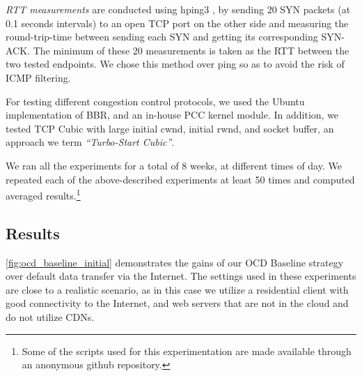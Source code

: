 \documentclass[newfonts=false,format=sigconf,10pt,letterpaper]{acmart}
\providecommand{\vs}{vs. }
\begin{document}
\vspace{0.1in} \textit{RTT measurements} are conducted using hping3 \cite{hping3}, by sending 20 SYN packets (at 0.1 seconds intervals) to an open TCP port on the other side and measuring the round-trip-time between sending each SYN and getting its corresponding SYN-ACK. The minimum of these 20 measurements is taken as the RTT between the two tested endpoints. We chose this method over ping so as to avoid the risk of ICMP filtering.

\vspace{0.1in} For testing different congestion control protocols, we used the Ubuntu implementation of BBR, and an in-house PCC kernel module. In addition, we tested TCP Cubic with large initial cwnd, initial rwnd, and socket buffer, an approach we term  \textit{``Turbo-Start Cubic''}. 

\vspace{0.1in} We ran all the experiments for a total of $8$ weeks, 
at different times of day. We repeated each of the above-described experiments at least 50 times and computed averaged results.\footnote{Some of the scripts used for this experimentation are made available through an anonymous github repository.}

\subsection{Results}\label{subsec:ocd-baseline_results}

\vspace{0.1in}\noindent{\bf Baseline \vs Internet e2e.} \autoref{fig:ocd_baseline_initial} demonstrates the gains of our OCD Baseline strategy over default data transfer via the Internet. The settings used in these experiments are close to a realistic scenario, as in this case we utilize a residential client with good connectivity to the Internet, and web servers that are not in the cloud and do not utilize CDNs.
\end{document}
